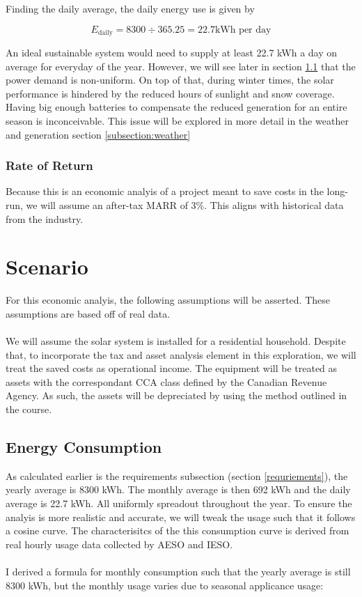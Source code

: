\documentclass[10pt,letterpaper]{article}
\begin{document}
Finding the daily average, the daily energy use is given by

$$
E_\text{daily}=8300\div 365.25 = 22.7\text{kWh per day}
$$

An ideal sustainable system would need to supply at least 22.7 kWh a day on average for everyday of the year. However, we will see later in section \ref{subsection:consumption} that the power demand is non-uniform. On top of that, during winter times, the solar performance is hindered by the reduced hours of sunlight and snow coverage. Having big enough batteries to compensate the reduced generation for an entire season is inconceivable. This issue will be explored in more detail in the weather and generation section \ref{subsection:weather}\\

\subsubsection{Rate of Return}

Because this is an economic analyis of a project meant to save costs in the long-run, we will assume an after-tax MARR of 3\%. This aligns with historical data from the industry.\\

\section{Scenario}\label{scenario}

For this economic analyis, the following assumptions will be asserted. These assumptions are based off of real data.\\
\\
We will assume the solar system is installed for a residential household. Despite that, to incorporate the tax and asset analysis element in this exploration, we will treat the saved costs as operational income. The equipment will be treated as assets with the correspondant CCA class defined by the Canadian Revenue Agency\cite{cca}. As such, the assets will be depreciated by using the method outlined in the course.\\

\subsection{Energy Consumption}\label{subsection:consumption}

As calculated earlier is the requirements subsection (section \ref{requriements}), the yearly average is 8300 kWh. The monthly average is then 692 kWh and  the daily average is 22.7 kWh. All uniformly spreadout throughout the year. To ensure the analyis is more realistic and accurate, we will tweak the usage such that it follows a cosine curve. The characterisitcs of the this consumption curve is derived from real hourly usage data collected by AESO and IESO.\cite{aeso-load-data, ieso-power-data}\\
\\
I derived a formula for monthly consumption such that the yearly average is still 8300 kWh, but the monthly usage varies due to seasonal applicance usage:
\end{document}
